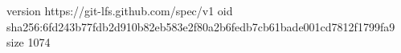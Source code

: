 version https://git-lfs.github.com/spec/v1
oid sha256:6fd243b77fdb2d910b82eb583e2f80a2b6fedb7cb61bade001cd7812f1799fa9
size 1074
